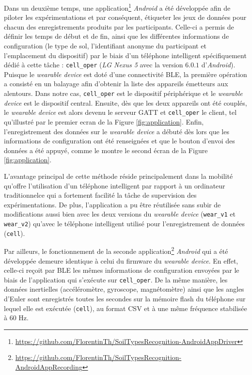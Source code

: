 Dans un deuxième temps, une application\footnote{\url{https://github.com/FlorentinTh/SoilTypesRecognition-AndroidAppDriver}} \textit{Android} a été développée afin de piloter les expérimentations et par conséquent, étiqueter les jeux de données pour chacun des enregistrements produits par les participants. Celle-ci a permis de définir les temps de début et de fin, ainsi que les différentes informations de configuration (le type de sol, l'identifiant anonyme du participant et l'emplacement du dispositif) par le biais d'un téléphone intelligent spécifiquement dédié à cette tâche : \texttt{cell\_oper} (\textit{LG Nexus 5} avec la version $6.0.1$ d'\textit{Android}). Puisque le \textit{wearable device} est doté d'une connectivité \acs{BLE}, la première opération a consisté en un balayage afin d'obtenir la liste des appareils émetteurs aux alentours. Dans notre cas, \texttt{cell\_oper} est le dispositif périphérique et le \textit{wearable device} est le dispositif central. Ensuite, dès que les deux appareils ont été couplés, le \textit{wearable device} est alors devenu le serveur \acs{GATT} et \texttt{cell\_oper} le client, tel qu'illustré par le premier ecran de la Figure \ref{fig:application}. Enfin, l'enregistrement des données sur le \textit{wearable device} a débuté dès lors que les informations de configuration ont été renseignées et que le bouton d'envoi des données a été appuyé, comme le montre le second écran de la Figure \ref{fig:application}.

L'avantage principal de cette méthode réside principalement dans la mobilité qu'offre l'utilisation d'un téléphone intelligent par rapport à un ordinateur traditionnel\textemdash ce qui a fortement facilité la tâche de supervision des expérimentations. De plus, l'application a pu être réutilisée sans subir de modifications aussi bien avec les deux versions du \textit{wearable device} (\texttt{wear\_v1} et \texttt{wear\_v2}) qu'avec le téléphone intelligent utilisé pour l'enregistrement de données (\texttt{cell}).

Par ailleurs, le fonctionnement de la seconde application\footnote{\url{https://github.com/FlorentinTh/SoilTypesRecognition-AndroidAppRecording}} \textit{Android} qui a été développée demeure identique à celui du firmware du \textit{wearable device}. En effet, celle-ci reçoit par \acs{BLE} les mêmes informations de configuration envoyées par le biais de l'application qui s'exécute sur \texttt{cell\_oper}. De la même manière, les données inertielles (accéléromètre, gyroscope, magnétomètre) ainsi que les angles d'Euler sont enregistrés toutes les secondes sur la mémoire flash du téléphone sur lequel elle est exécutée (\texttt{cell}), au format \acs{CSV} et à une même fréquence stabilisée à 60 Hz.

